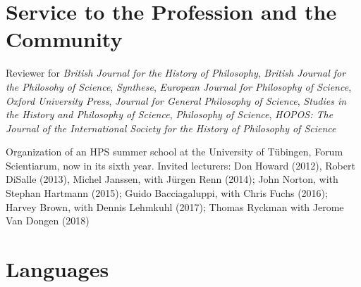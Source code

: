 \documentclass{article}
\renewenvironment{itemize}{
  \begin{list}{}{
    \setlength{\leftmargin}{1.5em}
  }
}{
  \end{list}
}
\begin{document}
%
%
%
%

%
%

 \section*{Service to the Profession and the Community}

\begin{itemize}
\item Reviewer for \emph{British Journal for the History of Philosophy}, \emph{British Journal for the {Philosohy} of Science}, \emph{Synthese}, \emph{European Journal for Philosophy of Science}, \emph{Oxford University Press}, \emph{Journal for General Philosophy of Science}, \emph{Studies in the History and Philosophy of Science}, \emph{Philosophy of Science}, \emph{{HOPOS}: {The Journal of the International Society for the History of Philosophy of Science}}
\item Organization of an HPS summer school at the University of T\"ubingen, Forum Scientiarum, now in its sixth year. Invited lecturers: Don Howard (2012), Robert DiSalle (2013), Michel Janssen, with J\"urgen Renn (2014); John Norton, with Stephan Hartmann  (2015); Guido Bacciagaluppi, with Chris Fuchs (2016); Harvey Brown, with Dennis Lehmkuhl (2017); Thomas Ryckman with Jerome Van Dongen (2018)
\end{itemize}


\section*{Languages}
\end{document}
